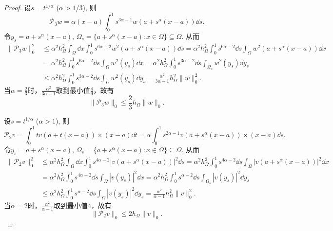 \begin{proof}
设$s=t^{1/\alpha}$ ($\alpha>1/3$), 则
$$
\mathcal{P}_3w= \alpha (x-a)\int_0^1s^{3\alpha-1}w(a+s^{\alpha}(x-a))\dd s.
$$
令$y_s=a+s^{\alpha}(x-a)$, $\Omega_s=\{a+s^{\alpha}(x-a): x\in\Omega\}\subseteq\Omega$.
从而
\begin{align*}
\|\mathcal{P}_3w\|_0^2&\leq\alpha^2h_{\Omega}^2\int_{\Omega}\dd x\int_0^1s^{6\alpha-2}w^2(a+s^{\alpha}(x-a))\dd s = \alpha^2h_{\Omega}^2\int_0^1s^{6\alpha-2}\dd s\int_{\Omega}w^2(a+s^{\alpha}(x-a))\dd x \\
&= \alpha^2h_{\Omega}^2\int_0^1s^{6\alpha-2}\dd s\int_{\Omega}w^2(y_s)\dd x= \alpha^2h_{\Omega}^2\int_0^1s^{3\alpha-2}\dd s\int_{\Omega_s}w^2(y_s)\dd y_s \\
&\leq \alpha^2h_{\Omega}^2\int_0^1s^{3\alpha-2}\dd s\int_{\Omega}w^2(y_s)\dd y_s=\frac{\alpha^2}{3\alpha-1}h_{\Omega}^2\|w\|_0^2.
\end{align*}
当$\alpha=\frac{2}{3}$时，$\frac{\alpha^2}{3\alpha-1}$取到最小值$\frac{4}{9}$，故有
$$
\|\mathcal{P}_3w\|_0\leq \frac{2}{3}h_{\Omega}\|w\|_0.
$$

设$s=t^{1/\alpha}$ ($\alpha>1$), 则
$$
\mathcal{P}_2v = \int_0^1tv(a+t(x-a))\times (x-a)\dd t= \alpha\int_0^1s^{2\alpha-1}v(a+s^{\alpha}(x-a))\times (x-a)\dd s.
$$
令$y_s=a+s^{\alpha}(x-a)$, $\Omega_s=\{a+s^{\alpha}(x-a): x\in\Omega\}\subseteq\Omega$.
从而
\begin{align*}
\|\mathcal{P}_2v\|_0^2&\leq\alpha^2h_{\Omega}^2\int_{\Omega}\dd x\int_0^1s^{4\alpha-2}|v(a+s^{\alpha}(x-a))|^2\dd s = \alpha^2h_{\Omega}^2\int_0^1s^{4\alpha-2}\dd s\int_{\Omega}|v(a+s^{\alpha}(x-a))|^2\dd x \\
&= \alpha^2h_{\Omega}^2\int_0^1s^{4\alpha-2}\dd s\int_{\Omega}|v(y_s)|^2\dd x= \alpha^2h_{\Omega}^2\int_0^1s^{\alpha-2}\dd s\int_{\Omega_s}|v(y_s)|^2\dd y_s \\
&\leq \alpha^2h_{\Omega}^2\int_0^1s^{\alpha-2}\dd s\int_{\Omega}|v(y_s)|^2\dd y_s=\frac{\alpha^2}{\alpha-1}h_{\Omega}^2\|v\|_0^2.
\end{align*}
当$\alpha=2$时，$\frac{\alpha^2}{\alpha-1}$取到最小值$4$，故有
$$
\|\mathcal{P}_2v\|_0\leq 2h_{\Omega}\|v\|_0.
$$


\end{proof}
